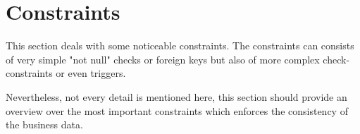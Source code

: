 \section{Constraints}

This section deals with some noticeable constraints. The constraints can consists of very simple "not null" checks or foreign keys but also of more complex check-constraints or even triggers.

Nevertheless, not every detail is mentioned here, this section should provide an overview over the most important constraints which enforces the consistency of the business data.

